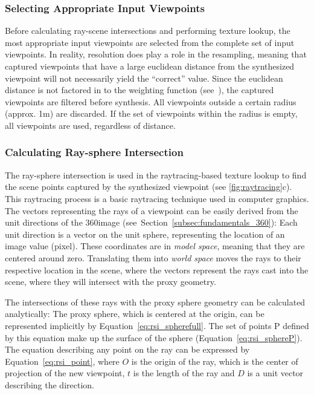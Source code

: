 \subsubsection{Selecting Appropriate Input Viewpoints}
Before calculating ray-scene intersections and performing texture lookup, the most appropriate input viewpoints are selected from the complete set of input viewpoints. In reality, resolution does play a role in the resampling, meaning that captured viewpoints that have a large euclidean distance from the synthesized viewpoint will not necessarily yield the ``correct'' value. Since the euclidean distance is not factored in to the weighting function (see~\pageref{misc:input_selection}), the captured viewpoints are filtered before synthesis. All viewpoints outside a certain radius (approx. 1m) are discarded. If the set of viewpoints within the radius is empty, all viewpoints are used, regardless of distance.

\subsubsection{Calculating Ray-sphere Intersection}
The ray-sphere intersection is used in the raytracing-based texture lookup to find the scene points captured by the synthesized viewpoint (see \ref{fig:raytracing}c). This raytracing process is a basic raytracing technique used in computer graphics. The vectors representing the rays of a viewpoint can be easily derived from the unit directions of the 360\degree image (see~Section~\ref{subsec:fundamentals_360}): Each unit direction is a vector on the unit sphere, representing the location of an image value (pixel). These coordinates are in \emph{model space}, meaning that they are centered around zero. Translating them into \emph{world space} moves the rays to their respective location in the scene, where the vectors represent the rays cast into the scene, where they will intersect with the proxy geometry.

The intersections of these rays with the proxy sphere geometry can be calculated analytically: The proxy sphere, which is centered at the origin, can be represented implicitly by Equation~\ref{eq:rsi_spherefull}. The set of points P defined by this equation make up the surface of the sphere (Equation~\ref{eq:rsi_sphereP}). 
The equation describing any point on the ray can be expressed by Equation~\ref{eq:rsi_point}, where $O$ is the origin of the ray, which is the center of projection of the new viewpoint, $t$ is the length of the ray and $D$ is a unit vector describing the direction. 

